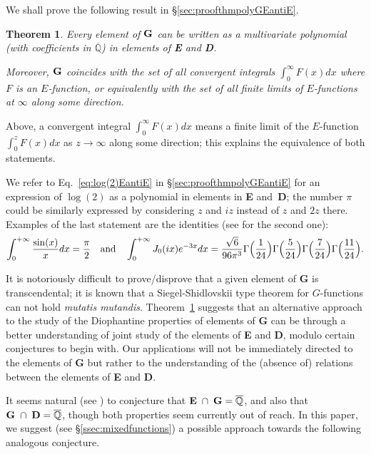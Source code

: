 \documentclass[reqno,12pt]{article}
\numberwithin{equation}{section}
\newtheorem{theo}{Theorem}
\theoremstyle{remark}
\newcommand{\Qbar}{\overline{\mathbb Q}}
\newcommand{\EE}{{\bf E}}
\begin{document}
We shall prove the following result in \S\ref{sec:proofthmpolyGEantiE}.

\begin{theo}\label{theo:GpolyEantiE} Every element of ${\bf G}$ can be written as a multivariate polynomial (with coefficients in $\Qbar$)  in elements of 
{\bf E} and {\bf D}.

Moreover, ${\bf G}$ coincides with the set of all convergent integrals $\int_0^{\infty }F(x)dx$ where $F$ is an $E$-function, or equivalently with the set of all finite limits of $E$-functions at $\infty$ along some direction.
\end{theo}
Above, a convergent integral $\int_0^{\infty}F(x)dx$ means a finite limit of the $E$-function $\int_0^zF(x)dx$ as $z\to \infty$ along some direction; this explains the equivalence of both statements.


We refer to  Eq.~\eqref{eq:log(2)EantiE} in \S\ref{sec:proofthmpolyGEantiE} for an expression of $\log(2)$ as a polynomial in elements in {\bf E} and~{\bf D}; the number $\pi$ could be similarly expressed by considering $z$ and $iz$ instead of $z$ and $2z$ there.  
Examples of the last statement are the identities (see \cite{zucker} for the second one):
$$
\int_0^{+\infty} \frac{\sin(x)}x dx=\frac{\pi}{2} \quad \textup{and} \quad \int_0^{+\infty}J_0(ix)e^{-3x}dx=\frac{\sqrt{6}}{96\pi^3}
\Gamma\Big(\frac{1}{24}\Big)\Gamma\Big(\frac{5}{24}\Big)\Gamma\Big(\frac{7}{24}\Big)\Gamma\Big(\frac{11}{24}\Big).
$$ 



It is notoriously difficult to prove/disprove that a given element of {\bf G} is transcendental; it is known that a Siegel-Shidlovskii type theorem for $G$-functions can not hold {\em mutatis mutandis}. Theorem~\ref{theo:GpolyEantiE} suggests that an alternative approach to the study of the Diophantine properties of elements of {\bf G} can be through a better understanding of joint study of the elements of {\bf E} and {\bf D}, modulo certain conjectures to begin with. Our applications will not be immediately directed to the elements of {\bf G} but rather to the understanding of the (absence of) relations between the elements of {\bf E} and {\bf D}.



 It seems natural (see \cite[p.~37]{ateo}) to conjecture that $\EE \; \cap \;{\bf G}=\Qbar$, and also that ${\bf G}\;\cap \;{\bf D}=\Qbar$, though both properties seem currently out of reach.  In this paper, we suggest (see \S \ref{ssec:mixedfunctions}) a possible approach towards the following analogous conjecture.
\end{document}
